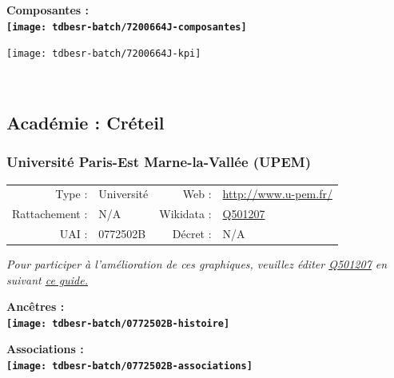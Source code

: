 \documentclass[12pt,french,]{article}
\begin{document}
\hrulefill

\begin{center} \bf Composantes : \\  
\texttt{[image: tdbesr-batch/7200664J-composantes]} \end{center}

\begin{center}\texttt{[image: tdbesr-batch/7200664J-kpi]} \end{center}\checkoddpage

\ifoddpage ~\newpage \fi   

\hypertarget{acaduxe9mie-cruxe9teil}{%
\subsection{Académie : Créteil}\label{acaduxe9mie-cruxe9teil}}

\hypertarget{universituxe9-paris-est-marne-la-valluxe9e-upem}{%
\subsubsection{Université Paris-Est Marne-la-Vallée
(UPEM)}\label{universituxe9-paris-est-marne-la-valluxe9e-upem}}

\begin{tabular*}{\textwidth}{rp{5cm}rl}  
\hline  
Type : & Université & Web : &\href{http://www.u-pem.fr/}{http://www.u-pem.fr/} \\  
Rattachement : & N/A & Wikidata : & \href{https://www.wikidata.org/entity/Q501207}{Q501207} \\  
UAI : & 0772502B & Décret : & N/A \\  
\hline  
\end{tabular*}

\textit{\scriptsize Pour participer à l'amélioration de ces graphiques, veuillez éditer  \href{https://www.wikidata.org/entity/Q501207}{Q501207}  en suivant \href{https://github.com/cpesr/wikidataESR/blob/master/Rmd/wikidataESR.md}{ce guide.}}

\vspace{1cm}  
\begin{minipage}[b]{0.50\textwidth}\begin{center} \bf Ancêtres : \\  
\texttt{[image: tdbesr-batch/0772502B-histoire]} \end{center}\end{minipage}\begin{minipage}[b]{0.50\textwidth}\begin{center} \bf Associations : \\  
\texttt{[image: tdbesr-batch/0772502B-associations]} \end{center}\end{minipage}
\end{document}
